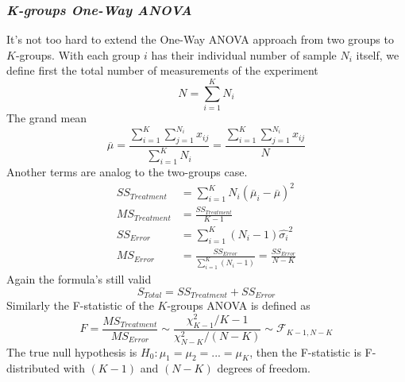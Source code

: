 \subsubsection{\it K-groups One-Way ANOVA}
It's not too hard to extend the One-Way ANOVA approach from two groups to $K$-groups. With each group $i$ has their individual number of sample $N_i$ itself, we define first the total number of measurements of the experiment
\begin{equation}
	N = \sum^K_{i=1}{N_i}
\end{equation}
The grand mean
\begin{equation}
	\overline \mu 	= \frac	{ \sum^{K}_{i=1}\sum^{N_i}_{j=1}{x_{ij}} }
							{\sum^K_{i=1}{N_i}} 
					= \frac	{ \sum^{K}_{i=1}\sum^{N_i}_{j=1}{x_{ij}} }{N}
\end{equation}
Another terms are analog to the two-groups case.
\begin{align} 
	\label{eq:SST}
	SS_{Treatment} 	&= \sum^K_{i=1}N_i(\overline \mu_i - \overline \mu)^2 \\
	\label{eq:MST}
	MS_{Treatment} 	&= \frac{ SS_{Treatment} }{ K - 1 } \\
	\label{eq:SSE}
	SS_{Error} 		&= \sum^K_{i=1}(N_i - 1)\hat{\sigma_i}^2 \\
	\label{eq:MSE}
	MS_{Error} 		&= \frac{ SS_{Error} }{ \sum^K_{i=1}(N_i - 1) }	= \frac{ SS_{Error} }{ N - K }	
\end{align}
Again the formula's still valid
\begin{equation*}
	S_{Total} 	= SS_{Treatment} + SS_{Error}
\end{equation*}
Similarly the F-statistic of the $K$-groups ANOVA is defined as
\begin{equation}
	F = \frac{MS_{Treatment}}{MS_{Error}} \sim \frac{\chi^2_{K-1}/{K-1}}{\chi^2_{N-K}/(N-K)} \sim \mathcal {F}_{K-1, N-K}
\end{equation}
The true null hypothesis is $H_0: \mu_1 = \mu_2 = ... = \mu_K$, then the F-statistic is F-distributed with $(K-1)$ and $(N-K)$ degrees of freedom.